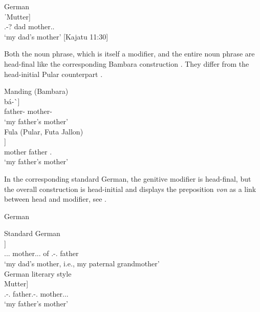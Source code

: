 \documentclass[output=paper]{langscibook}
\begin{document}
    \begin{exe}
        \ex\label{fanego:ex:19} German \\
        \gll [[ˈmein-e ˈPapa] ˈMutter] \\
        \POSS.\Fsg-? dad mother.\F.\NOM{} \\
        \glt ‘my dad’s mother’ [Kajatu 11:30]
    \end{exe}

\noindent
Both the noun phrase, which is itself a modifier, and the entire noun phrase are head-final like the corresponding Bambara construction . They differ from the head-initial Pular counterpart .

    \begin{exe}
        \ex\label{fanego:ex:20} Manding (Bambara) \\
        \gll [[ń fà-\`{}] bá-\`{}] \\
        \First\SG{} father-\ART{} mother-\ART{} \\
        \glt ‘my father’s mother’ \\
        \ex\label{fanego:ex:21} Fula (Pular, Futa Jallon) \\
        \gll [neene [baaba an]] \\
        mother father \POSS.\First\SG{} \\
        \glt ‘my father’s mother’
    \end{exe}

\noindent
In the corresponding standard German, the genitive modifier is head-final, but the overall construction is head-initial and displays the preposition \textit{von} as a link between head and modifier, see .

    \begin{exe}
        \ex\label{fanego:ex:22} German
        \begin{xlist}
            \ex\label{fanego:ex:22a} Standard German \\
            \gll [die Mutter von [mein-em Papa]] \\
            \Def.\F.\SG.\NOM{} mother.\SG.\F.\NOM{} of \POSS.\First\SG-\M.\DAT{} father \\
            \glt ‘my dad’s mother, i.e., my paternal grandmother’ \\
            \ex\label{fanego:ex:22b} German literary style \\
            \gll [[mein-es Vater-s] Mutter] \\
            \POSS.\First\SG-\M.\GEN{} father.\SG-\M.\GEN{} mother.\SG.\F.\NOM{} \\
            \glt ‘my father’s mother’
        \end{xlist}
    \end{exe}
\end{document}
